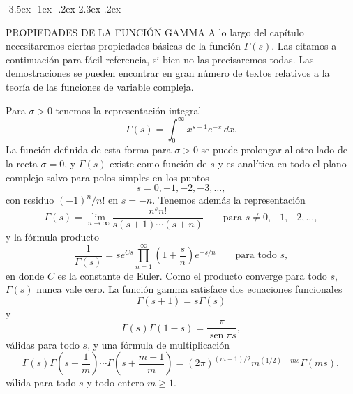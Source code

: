 \documentclass[12pt,a4paper]{book}
\makeatletter
\renewcommand\section{\@startsection{section}{1}{\z@}%
  {-3.5ex \@plus -1ex \@minus -.2ex}%
  {2.3ex \@plus .2ex}%
  {\normalfont\Large\bfseries\raggedright}}
\makeatother
\begin{document}
    \section{PROPIEDADES DE LA FUNCIÓN GAMMA}\label{sim:Gam}
    A lo largo del capítulo necesitaremos ciertas propiedades básicas de la función
    $\Gamma(s)$. Las citamos a continuación para fácil referencia, si bien no las precisaremos
    todas. Las demostraciones se pueden encontrar en gran número de textos relativos a la
    teoría de las funciones de variable compleja.

    Para $\sigma>0$ tenemos la representación integral
    \begin{equation}\label{eq:12-1}
        \Gamma(s)=\int_{0}^{\infty}x^{s-1}e^{-x}\,dx.
    \end{equation}
    La función definida de esta forma para $\sigma>0$ se puede prolongar al otro lado de la
    recta $\sigma=0$, y $\Gamma(s)$ existe como función de $s$ y es analítica en todo el plano
    complejo salvo para polos simples en los puntos
    \begin{equation*}
        s=0,-1,-2,-3,\dots,
    \end{equation*}
    con residuo $(-1)^{n}/n!$ en $s=-n$. Tenemos además la representación
    \begin{equation*}
        \Gamma(s)=\lim_{n\to\infty}\frac{n^{s}n!}{s(s+1)\cdots(s+n)}\qquad\text{para }s\neq0,-1,-2,\dots,
    \end{equation*}
    y la fórmula producto
    \begin{equation*}
        \frac{1}{\Gamma(s)}=se^{Cs}\prod_{n=1}^{\infty}\left(1+\frac{s}{n}\right)e^{-s/n}\qquad\text{para todo }s,
    \end{equation*}
    en donde $C$ es la constante de Euler. Como el producto converge para todo $s$,
    $\Gamma(s)$ nunca vale cero. La función gamma satisface dos ecuaciones funcionales
    \begin{equation}\label{eq:12-2}
        \Gamma(s+1)=s\Gamma(s)
    \end{equation}
    y
    \begin{equation}\label{eq:12-3}
        \Gamma(s)\Gamma(1-s)=\frac{\pi}{\operatorname{sen}\pi s},
    \end{equation}
    válidas para todo $s$, y una fórmula de multiplicación
    \begin{equation}\label{eq:12-4}
        \Gamma(s)\Gamma\left(s+\frac{1}{m}\right)\cdots\Gamma\left(s+\frac{m-1}{m}\right)=(2\pi)^{(m-1)/2}m^{(1/2)-ms}\Gamma(ms),
    \end{equation}
    válida para todo $s$ y todo entero $m\geq1$.
\end{document}
